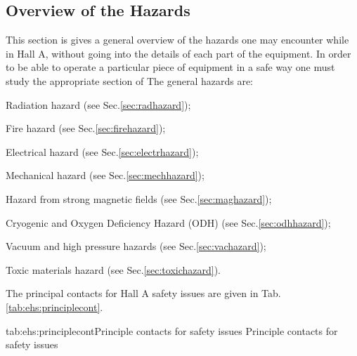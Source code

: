  
\begin{safetyen}{0}{0}
\section{Overview of the Hazards} 
\end{safetyen}
\label{sec:overviewhazards}

This section is gives a general overview of the hazards one may encounter
while in Hall A,
without going into the details of each part of the equipment.  In order to 
be able to operate a particular piece of equipment in a safe way one must study the appropriate
section of  
The general hazards are:
\begin{list}{.~}{\setlength{\itemsep}{-0.15cm}}
  \item Radiation hazard (see Sec.\ref{sec:radhazard});
  \item Fire hazard (see Sec.\ref{sec:firehazard});
  \item Electrical hazard (see Sec.\ref{sec:electrhazard});
  \item Mechanical hazard (see Sec.\ref{sec:mechhazard});
  \item Hazard from strong magnetic fields (see Sec.\ref{sec:maghazard});
  \item Cryogenic and Oxygen Deficiency Hazard (ODH) (see Sec.\ref{sec:odhhazard});
  \item Vacuum and high pressure hazards  (see Sec.\ref{sec:vachazard});
  \item Toxic materials hazard  (see Sec.\ref{sec:toxichazard}).
\end{list}

The principal contacts for Hall A safety issues are given in Tab.\ref{tab:ehs:principlecont}.
 
\begin{namestab}{tab:ehs:principlecont}{Principle contacts for safety issues}{%
   Principle contacts for safety issues}
\end{namestab}
 
